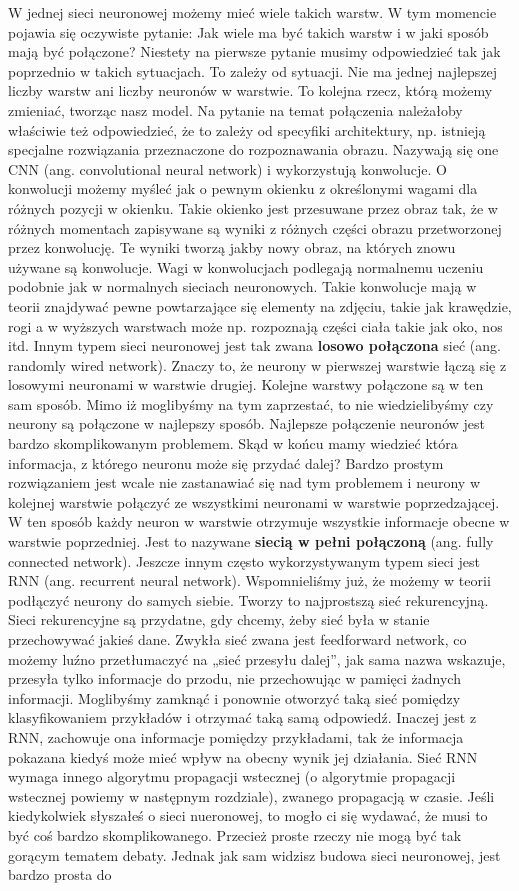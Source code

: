 W jednej sieci neuronowej możemy mieć wiele takich warstw. W tym momencie pojawia się oczywiste pytanie: Jak wiele ma być takich warstw i w jaki sposób mają być połączone? Niestety na pierwsze pytanie musimy odpowiedzieć tak jak poprzednio w takich sytuacjach. To zależy od sytuacji. Nie ma jednej najlepszej liczby warstw ani liczby neuronów w warstwie. To kolejna rzecz, którą możemy zmieniać, tworząc nasz model. Na pytanie na temat połączenia należałoby właściwie też odpowiedzieć, że to zależy od specyfiki architektury, np. istnieją specjalne rozwiązania przeznaczone do rozpoznawania obrazu. Nazywają się one CNN (ang. convolutional neural network) i wykorzystują konwolucje. O konwolucji możemy myśleć jak o pewnym okienku z określonymi wagami dla różnych pozycji w okienku. Takie okienko jest przesuwane przez obraz tak, że w różnych momentach zapisywane są wyniki z różnych części obrazu przetworzonej przez konwolucję. Te wyniki tworzą jakby nowy obraz, na których znowu używane są konwolucje. Wagi w konwolucjach podlegają normalnemu uczeniu podobnie jak w normalnych sieciach neuronowych. Takie konwolucje mają w teorii znajdywać pewne powtarzające się elementy na zdjęciu, takie jak krawędzie, rogi a w wyższych warstwach może np. rozpoznają części ciała takie jak oko, nos itd. Innym typem sieci neuronowej jest tak zwana \textbf{losowo połączona} sieć (ang. randomly wired network). Znaczy to, że neurony w pierwszej warstwie łączą się z losowymi neuronami w warstwie drugiej. Kolejne warstwy połączone są w ten sam sposób. Mimo iż moglibyśmy na tym zaprzestać, to nie wiedzielibyśmy czy neurony są połączone w najlepszy sposób. Najlepsze połączenie neuronów jest bardzo skomplikowanym problemem. Skąd w końcu mamy wiedzieć która informacja, z którego neuronu może się przydać dalej? Bardzo prostym rozwiązaniem jest wcale nie zastanawiać się nad tym problemem i neurony w kolejnej warstwie połączyć ze wszystkimi neuronami w warstwie poprzedzającej. W ten sposób każdy neuron w warstwie otrzymuje wszystkie informacje obecne w warstwie poprzedniej. Jest to nazywane \textbf{siecią w pełni połączoną} (ang. fully connected network). Jeszcze innym często wykorzystywanym typem sieci jest RNN (ang. recurrent neural network). Wspomnieliśmy już, że możemy w teorii podłączyć neurony do samych siebie. Tworzy to najprostszą sieć rekurencyjną. Sieci rekurencyjne są przydatne, gdy chcemy, żeby sieć była w stanie przechowywać jakieś dane. Zwykła sieć zwana jest feedforward network, co możemy luźno przetłumaczyć na „sieć przesyłu dalej”, jak sama nazwa wskazuje, przesyła tylko informacje do przodu, nie przechowując w pamięci żadnych informacji. Moglibyśmy zamknąć i ponownie otworzyć taką sieć pomiędzy klasyfikowaniem przykładów i otrzymać taką samą odpowiedź. Inaczej jest z RNN, zachowuje ona informacje pomiędzy przykładami, tak że informacja pokazana kiedyś może mieć wpływ na obecny wynik jej działania. Sieć RNN wymaga innego algorytmu propagacji wstecznej (o algorytmie propagacji wstecznej powiemy w następnym rozdziale), zwanego propagacją w czasie. Jeśli kiedykolwiek słyszałeś o sieci nueronowej, to mogło ci się wydawać, że musi to być coś bardzo skomplikowanego. Przecież proste rzeczy nie mogą być tak gorącym tematem debaty. Jednak jak sam widzisz budowa sieci neuronowej, jest bardzo prosta do 